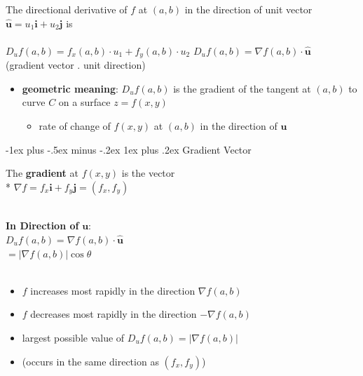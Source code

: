 \documentclass[10pt, landscape]{article}
\makeatletter
\renewcommand{\subsubsection}{\@startsection{subsubsection}{3}{0mm}%
                                {-1ex plus -.5ex minus -.2ex}%
                                {1ex plus .2ex}%
                                {\normalfont\small\bfseries}}%
\newcommand{\abs}[1]{\vert #1 \vert}
\newcommand{\vv}[1]{\boldsymbol{#1}}
\makeatother
\begin{document}
\begin{multicols*}{4}
    The directional derivative of $f$ at $(a, b)$ in the direction of 
    unit vector $\hat{\vv{u}} = u_1\vv{i} + u_2\vv{j}$ is \\ ~\\

    $D_uf(a, b) = f_x(a, b) \cdot u_1 + f_y(a, b) \cdot u_2$
    $D_uf(a, b) = \nabla f(a, b) \cdot \hat{\vv{u}}$ 
    \\(gradient vector . unit direction)

\begin{itemize}
    \item \textbf{geometric meaning}: $D_uf(a, b)$ is the gradient of the tangent at $(a, b)$ to curve $C$ on a surface $z= f(x, y)$
    \begin{itemize}
        \item rate of change of $f(x, y)$ at $(a, b)$ in the direction of $\vv{u}$
    \end{itemize}
\end{itemize}


\subsubsection{Gradient Vector}

    The \textbf{gradient} at $f(x, y)$ is the vector 
    \\* $\nabla f = f_x\vv{i} + f_y\vv{j} = (f_x, f_y)$
    
~\\ \textbf{In Direction of} $\vv{u}$:
        \\ $D_uf(a, b) = \nabla f(a, b) \cdot \hat{\vv{u}}$
        \\ \hspace{36pt}   $ = \abs{\nabla f(a, b)} \cos\theta$
\\~\\

\begin{itemize}
    \item $f$ increases most rapidly in the direction $\nabla f(a, b)$
    \item $f$ decreases most rapidly in the direction $-\nabla f(a, b)$
    \item largest possible value of $D_uf(a, b) = \vert \nabla f(a, b)\vert$
    \item (occurs in the same direction as $(f_x, f_y)$)


\end{itemize}
\end{multicols*}
\end{document}
